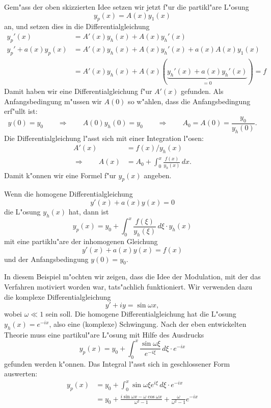 Gem"ass der oben skizzierten Idee setzen wir jetzt f"ur die partikl"are
L"osung 
\[
y_p(x)=A(x) y_1(x)
\]
an, und setzen dies in die Differentialgleichung
\begin{align*}
y_p'(x)
&=
A'(x)y_h(x)+A(x)y_h'(x)
\\
y_p'+a(x)y_p(x)
&=
A'(x)y_h(x)+A(x)y_h'(x)
+
a(x)A(x)y_1(x)
\\
&=
A'(x)y_h(x)+A(x)(\underbrace{y_h'(x)+a(x)y_h'(x)}_{=0})=f
\end{align*}
Damit haben wir eine Differentialgleichung f"ur $A'(x)$ gefunden.
Als Anfangsbedingung m"ussen wir $A(0)$ so w"ahlen, dass
die Anfangsbedingung erf"ullt ist:
\[
y(0)=y_0
\qquad\Rightarrow\qquad
A(0)y_h(0)=y_0
\qquad\Rightarrow\qquad
A_0=A(0)=\frac{y_0}{y_h(0)}.
\]
Die Differentialgleichung l"asst sich mit einer Integration l"osen:
\begin{align*}
A'(x)
&=
f(x)/y_h(x)
\\
\Rightarrow\qquad
A(x)
&=
A_0+
\int_0^x \frac{f(x) }{y_h(x)}\,dx.
\end{align*}
Damit k"onnen wir eine Formel f"ur $y_p(x)$ angeben.

\begin{satz}
Wenn die homogene Differentialgleichung
\[
y'(x)+a(x)y(x) = 0
\]
die L"osung $y_h(x)$ hat, dann ist
\[
y_p(x)=y_0+\int_0^x\frac{f(\xi)}{y_h(\xi)}\,d\xi\cdot y_h(x)
\]
mit eine partiklu"are der inhomogenen Gleichung
\[
y'(x)+a(x)y(x)=f(x)
\]
und der Anfangsbedingung $y(0)=y_0$.
\end{satz}

\begin{beispiel}
In diesem Beispiel m"ochten wir zeigen, dass die Idee der Modulation,
mit der das Verfahren motiviert worden war, tats"achlich funktioniert.
Wir verwenden dazu die komplexe Differentialgleichung
\[
y'+iy=\sin \omega x,
\]
wobei $\omega \ll 1$ sein soll.
Die homogene Differentialgleichung hat die L"osung $y_h(x)=e^{-ix}$,
also eine (komplexe) Schwingung.
Nach der eben entwickelten Theorie muss eine partikul"are L"osung
mit Hilfe des Ausdrucks
\[
y_p(x)=y_0 +\int_0^x\frac{\sin\omega\xi}{e^{-i\xi}}\,d\xi\cdot e^{-ix}
\]
gefunden werden k"onnen.
Das Integral l"asst sich in geschlossener Form auswerten:
\begin{align*}
y_p(x)
&=
y_0 + \int_0^x \sin\omega\xi e^{i\xi}\,d\xi\cdot e^{-ix}
\\
&=
y_0+
\frac{i\sin \omega x- \omega \cos \omega x}{\omega^2-1}
+\frac{\omega}{\omega^2-1}e^{-ix}
\end{align*}
\end{beispiel}

